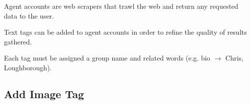 \begin{minipage}{\textwidth}
  \centering
  \begin{minipage}[t]{4.6cm}
    \vspace{0pt}
    \centering
    \begin{minipage}{4.4cm}
      Agent accounts are web scrapers that trawl the web and return any requested data to the user.
    \end{minipage}
  \end{minipage}
  \begin{minipage}[t]{4.6cm}
    \vspace{0pt}
    \centering
    \begin{minipage}{4.4cm}
      Text tags can be added to agent accounts in order to refine the quality of results gathered.
    \end{minipage}
  \end{minipage}
  \begin{minipage}[t]{4.6cm}
    \vspace{0pt}
    \centering
    \begin{minipage}{4.4cm}
      Each tag must be assigned a group name and related words (e.g. bio $\rightarrow$ Chris, Loughborough).
    \end{minipage}
  \end{minipage}
\end{minipage}

\clearpage

\subsection{Add Image Tag}

